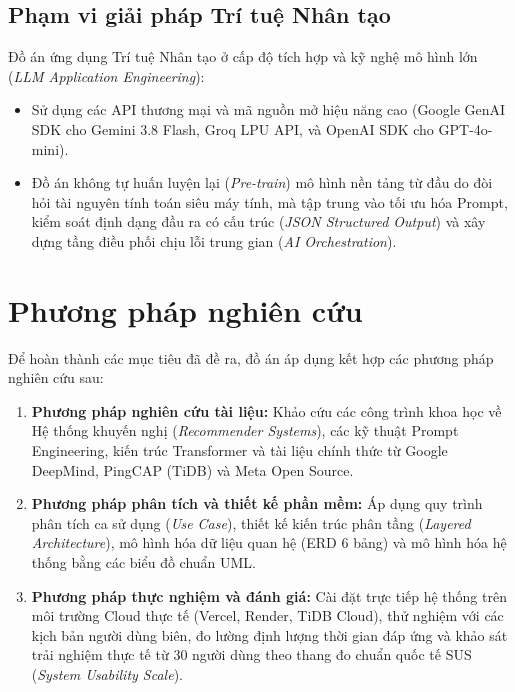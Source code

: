 \subsection{Phạm vi giải pháp Trí tuệ Nhân tạo}

Đồ án ứng dụng Trí tuệ Nhân tạo ở cấp độ tích hợp và kỹ nghệ mô hình lớn (\textit{LLM Application Engineering}):
\begin{itemize}[leftmargin=1.2cm, itemsep=2pt]
    \item Sử dụng các API thương mại và mã nguồn mở hiệu năng cao (Google GenAI SDK cho Gemini 3.8 Flash, Groq LPU API, và OpenAI SDK cho GPT-4o-mini).
    \item Đồ án không tự huấn luyện lại (\textit{Pre-train}) mô hình nền tảng từ đầu do đòi hỏi tài nguyên tính toán siêu máy tính, mà tập trung vào tối ưu hóa Prompt, kiểm soát định dạng đầu ra có cấu trúc (\textit{JSON Structured Output}) và xây dựng tầng điều phối chịu lỗi trung gian (\textit{AI Orchestration}).
\end{itemize}


\section{Phương pháp nghiên cứu}

Để hoàn thành các mục tiêu đã đề ra, đồ án áp dụng kết hợp các phương pháp nghiên cứu sau:
\begin{enumerate}[leftmargin=1.2cm, itemsep=3pt]
    \item \textbf{Phương pháp nghiên cứu tài liệu:} Khảo cứu các công trình khoa học về Hệ thống khuyến nghị (\textit{Recommender Systems}), các kỹ thuật Prompt Engineering, kiến trúc Transformer và tài liệu chính thức từ Google DeepMind, PingCAP (TiDB) và Meta Open Source.
    
    \item \textbf{Phương pháp phân tích và thiết kế phần mềm:} Áp dụng quy trình phân tích ca sử dụng (\textit{Use Case}), thiết kế kiến trúc phân tầng (\textit{Layered Architecture}), mô hình hóa dữ liệu quan hệ (ERD 6 bảng) và mô hình hóa hệ thống bằng các biểu đồ chuẩn UML.
    
    \item \textbf{Phương pháp thực nghiệm và đánh giá:} Cài đặt trực tiếp hệ thống trên môi trường Cloud thực tế (Vercel, Render, TiDB Cloud), thử nghiệm với các kịch bản người dùng biên, đo lường định lượng thời gian đáp ứng và khảo sát trải nghiệm thực tế từ 30 người dùng theo thang đo chuẩn quốc tế SUS (\textit{System Usability Scale}).
\end{enumerate}

